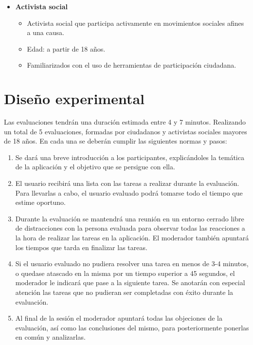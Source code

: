 \begin{itemize}
 \item \textbf{Activista social}
 \begin{itemize}
  \item Activista social que participa activamente en movimientos sociales afines a una causa.
  \item Edad: a partir de 18 años.
  \item Familiarizados con el uso de herramientas de participación ciudadana.
 \end{itemize}
\end{itemize}

\section{Diseño experimental}

Las evaluaciones tendrán una duración estimada entre 4 y 7 minutos. Realizando un total de 5 evaluaciones, formadas por ciudadanos y activistas sociales mayores de 18 años. En cada una se deberán cumplir las siguientes normas y pasos:

\begin{enumerate}
 \item Se dará una breve introducción a los participantes, explicándoles  la temática de la aplicación y el objetivo que se persigue con ella.
 \item El usuario recibirá una lista con las tareas a realizar durante la evaluación. Para llevarlas a cabo, el usuario evaluado podrá tomarse todo el tiempo que estime oportuno.
 \item Durante la evaluación se mantendrá una reunión en un entorno cerrado libre de distracciones con la persona evaluada para observar todas las reacciones a la hora de realizar las tareas en la aplicación. El moderador también apuntará los tiempos que tarda en finalizar las tareas.
 \item Si el usuario evaluado no pudiera resolver una tarea en menos de 3-4 minutos, o quedase atascado en la misma por un tiempo superior a 45 segundos, el moderador le indicará que pase a la siguiente tarea. Se anotarán con especial atención las tareas que no pudieran ser completadas con éxito durante la evaluación.
 \item Al final de la sesión el moderador apuntará todas las objeciones de la evaluación, así como las conclusiones del mismo, para posteriormente ponerlas en común y analizarlas.
 \end{enumerate}

